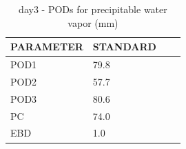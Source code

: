 \begin{table}[p!]
\begin{center}
\begin{tabular}{|l|l|l|l|}
\hline
\multicolumn{1}{|c|}{\cellcolor[HTML]{C0C0C0}\textbf{PARAMETER}} & \multicolumn{1}{c|}{\cellcolor[HTML]{C0C0C0}\textbf{STANDARD}} \\
\hline
\cellcolor[HTML]{C0C0C0}POD1  & 79.8                                \\
\cellcolor[HTML]{C0C0C0}POD2  & 57.7                                \\
\cellcolor[HTML]{C0C0C0}POD3  & 80.6                                \\
\cellcolor[HTML]{C0C0C0}PC    & 74.0                                  \\
\cellcolor[HTML]{C0C0C0}EBD   & 1.0                                 \\
\hline
\end{tabular}
\caption{day3 - PODs for precipitable water vapor (mm)}
\label{tab:podpwv:day3}
\end{center}
\end{table}
